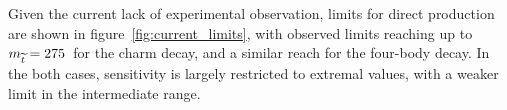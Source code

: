Given the current lack of experimental observation, limits for direct \sTop
production are shown in figure~\ref{fig:current_limits}, with observed limits
reaching up to $m_{\widetilde{t}} = 275$~\gev for the charm decay, and a similar reach
for the four-body decay. In the both cases, sensitivity is largely restricted to
extremal \deltam values, with a weaker limit in the intermediate range.